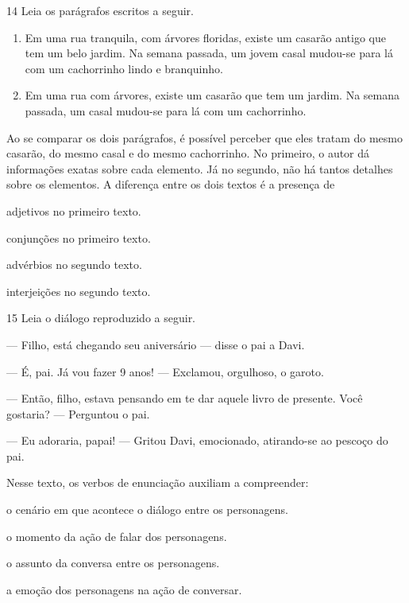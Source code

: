 \num{14} Leia os parágrafos escritos a seguir.

\begin{myquote}
\begin{enumerate}
\item Em uma rua tranquila, com árvores floridas, existe um casarão antigo
que tem um belo jardim. Na semana passada, um jovem casal mudou-se para
lá com um cachorrinho lindo e branquinho.

\item Em uma rua com árvores, existe um casarão que tem um jardim. Na
semana passada, um casal mudou-se para lá com um cachorrinho.
\end{enumerate}
\end{myquote}

Ao se comparar os dois parágrafos, é possível perceber que eles tratam
do mesmo casarão, do mesmo casal e do mesmo cachorrinho. No primeiro, o
autor dá informações exatas sobre cada elemento. Já no segundo, não há
tantos detalhes sobre os elementos. A diferença entre os dois textos é a
presença de

\begin{escolha}
\item adjetivos no primeiro texto.

\item conjunções no primeiro texto.

\item advérbios no segundo texto.

\item interjeições no segundo texto.
\end{escolha}


\num{15} Leia o diálogo reproduzido a seguir.

\begin{myquote}
--- Filho, está chegando seu aniversário --- disse o pai a Davi.

--- É, pai. Já vou fazer 9 anos! --- Exclamou, orgulhoso, o
garoto.

--- Então, filho, estava pensando em te dar aquele livro de
presente. Você gostaria? --- Perguntou o pai.

--- Eu adoraria, papai! --- Gritou Davi, emocionado, atirando-se
ao pescoço do pai.

\end{myquote}

Nesse texto, os verbos de enunciação auxiliam a compreender:

\begin{escolha}
\item o cenário em que acontece o diálogo entre os personagens.

\item o momento da ação de falar dos personagens.

\item o assunto da conversa entre os personagens.

\item a emoção dos personagens na ação de conversar.
\end{escolha}


